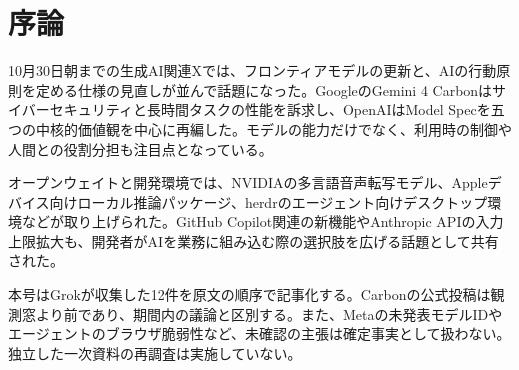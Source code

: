 \section*{序論}
10月30日朝までの生成AI関連Xでは、フロンティアモデルの更新と、AIの行動原則を定める仕様の見直しが並んで話題になった。GoogleのGemini 4 Carbonはサイバーセキュリティと長時間タスクの性能を訴求し、OpenAIはModel Specを五つの中核的価値観を中心に再編した。モデルの能力だけでなく、利用時の制御や人間との役割分担も注目点となっている。

オープンウェイトと開発環境では、NVIDIAの多言語音声転写モデル、Appleデバイス向けローカル推論パッケージ、herdrのエージェント向けデスクトップ環境などが取り上げられた。GitHub Copilot関連の新機能やAnthropic APIの入力上限拡大も、開発者がAIを業務に組み込む際の選択肢を広げる話題として共有された。

本号はGrokが収集した12件を原文の順序で記事化する。Carbonの公式投稿は観測窓より前であり、期間内の議論と区別する。また、Metaの未発表モデルIDやエージェントのブラウザ脆弱性など、未確認の主張は確定事実として扱わない。独立した一次資料の再調査は実施していない。
